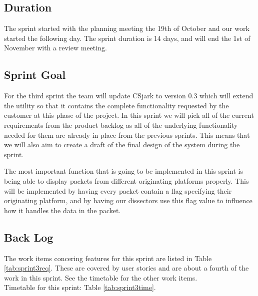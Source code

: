 \subsection{Duration}

The sprint started with the planning meeting the 19th of October and our work started the following day. The sprint duration is 14 days, and will end the 1st of November with a review meeting. 


\subsection{Sprint Goal}
For the third sprint the team will update CSjark to version 0.3 which will extend the \gls{utility} so that it contains the complete functionality requested by the customer at this phase of the project. In this sprint we will pick all of the current requirements from the product backlog as all of the underlying functionality needed for them are already in place from the previous sprints. This means that we will also aim to create a draft of the final design of the system during the sprint.

The most important function that is going to be implemented in this sprint is being able to display packets from different originating platforms properly. This will be implemented by having every \gls{packet} contain a flag specifying their originating platform, and by having our \glspl{dissector} use this flag value to influence how it handles the data in the \gls{packet}.

\subsection{Back Log}
The work items concering features for this sprint are listed in Table \ref{tab:sprint3req}. These are covered by user stories and are about a fourth of the work in this sprint. See the timetable for the other work items.\\
Timetable for this sprint: Table \ref{tab:sprint3time}.\\

